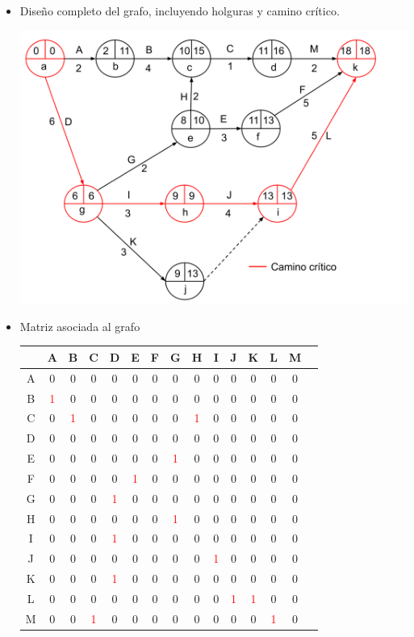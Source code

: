 \documentclass[12pt]{article}
\begin{document}
\begin{itemize}
    \item Diseño completo del grafo, incluyendo holguras y camino crítico.
    
    \includegraphics[scale=0.3]{../figures/pert_01.png}

    \item Matriz asociada al grafo
    
    \begin{center}
    \begin{tabular}{c|cccccccccccccc}
          & A & B & C & D & E & F & G & H & I & J & K & L & M \\
      \hline
        A   & 0 & 0 & 0 & 0 & 0 & 0 & 0 & 0 & 0 & 0 & 0 & 0 & 0 \\
        B   & \textcolor{red}{1} & 0 & 0 & 0 & 0 & 0 & 0 & 0 & 0 & 0 & 0 & 0 & 0 \\
        C   & 0 & \textcolor{red}{1} & 0 & 0 & 0 & 0 & 0 & \textcolor{red}{1}& 0 & 0 & 0 & 0 & 0 \\
        D   & 0 & 0 & 0 & 0& 0& 0& 0& 0& 0& 0& 0& 0& 0 \\
        E   & 0 & 0 & 0 & 0& 0& 0& \textcolor{red}{1}& 0& 0& 0& 0& 0& 0 \\
        F   & 0 & 0 & 0 & 0& \textcolor{red}{1}& 0& 0& 0& 0& 0& 0& 0& 0 \\
        G   & 0 & 0 & 0 & \textcolor{red}{1}& 0& 0& 0& 0& 0& 0& 0& 0& 0 \\
        H   & 0 & 0 & 0 & 0& 0& 0& \textcolor{red}{1}& 0& 0& 0& 0& 0& 0 \\
        I   & 0 & 0 & 0 & \textcolor{red}{1}& 0& 0& 0& 0& 0& 0& 0& 0& 0 \\
        J   & 0 & 0 & 0 & 0& 0& 0& 0& 0& \textcolor{red}{1}& 0& 0& 0& 0 \\
        K   & 0 & 0 & 0 & \textcolor{red}{1}& 0& 0& 0& 0& 0& 0& 0& 0& 0 \\
        L   & 0 & 0 & 0 & 0& 0& 0& 0& 0& 0& \textcolor{red}{1}& \textcolor{red}{1}& 0& 0 \\
        M   & 0 & 0 & \textcolor{red}{1} & 0& 0& 0& 0& 0& 0& 0& 0& \textcolor{red}{1}& 0 \\
    \end{tabular}
  \end{center}


\end{itemize}
\end{document}
